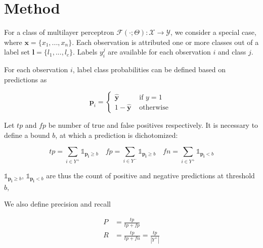 
\section{Method}
\label{sec:orga8a42f5}


For a class of multilayer perceptron \(\mathcal{F}(\cdot ; \Theta): \mathcal{X} \rightarrow \mathcal{Y}\), we consider a special case, where \(\mathbf{x} = \{x_1, ..., x_n\}\). Each observation is attributed one or more classes out of a label set \(\mathbf{l} = \{l_1, ..., l_c\}\). Labels \(y_{i}^{j}\) are available for each observation \(i\) and class \(j\). 

For each observation \(i\), label class probabilities can be defined based on predictions as


\begin{equation}
\mathbf{p}_{i}=\left\{\begin{array}{ll}\hat{\mathbf{y}} & \text { if } y=1 \\ 1-\hat{\mathbf{y}} & \text { otherwise }\end{array}\right.
\end{equation}

Let \(tp\) and \(fp\) be number of true and false positives respectively. It is necessary to define a bound \(b\), at which a prediction is dichotomized:

\begin{equation}
\label{eq:conf}
 t p=\sum_{i \in Y^{+}} \mathds{1}_{\mathbf{p_i} \geq b} \quad f p=\sum_{i \in Y^{-}} \mathds{1}_{\mathbf{p_i} \geq b} \quad fn = \sum_{i \in Y^{+}} \mathds{1}_{\mathbf{p_i} < b}
\end{equation}

\(\mathds{1}_{\mathbf{p_i} \geq b}\), \(\mathds{1}_{\mathbf{p_i} < b}\) are thus the count of positive and negative predictions at threshold \(b\), 

We also define precision and recall

\begin{equation}
\begin{aligned} P &=\frac{t p}{t p+f p} \\ R &=\frac{t p}{t p+f n}=\frac{t p}{\left|Y^{+}\right|} \end{aligned}
\end{equation}


